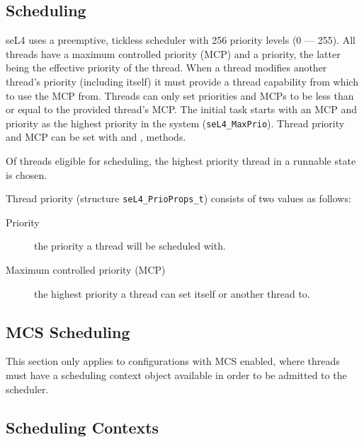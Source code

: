 \subsection{Scheduling}
\label{sec:sched}

seL4 uses a preemptive, tickless scheduler with 256 priority levels (0 --- 255).  All threads have
a maximum controlled priority (MCP) and a priority, the latter being the effective priority of the
thread.
When a thread modifies another thread's priority (including itself) it must provide a
thread capability from which to use the MCP from. Threads can only set priorities and MCPs
to be less than or equal to the provided thread's MCP.
The initial task starts with an MCP and priority as the highest priority in the system (\texttt{seL4\_MaxPrio}).
Thread priority and MCP can be
set with  and
,
 methods.


Of threads eligible for scheduling, the highest priority thread in a runnable state is chosen.

Thread priority (structure \texttt{seL4\_PrioProps\_t}) consists of two values as follows:

\begin{description} \item[Priority] the priority a thread will be scheduled with.  \item[Maximum
controlled priority (MCP)] the highest priority a thread can set itself or another thread to.
\end{description}

\subsection{MCS Scheduling}

This section only applies to configurations with MCS enabled, where threads must have
a scheduling context object available in order to be admitted to the scheduler.

\subsection{Scheduling Contexts}
\label{sec:scheduling_contexts}

